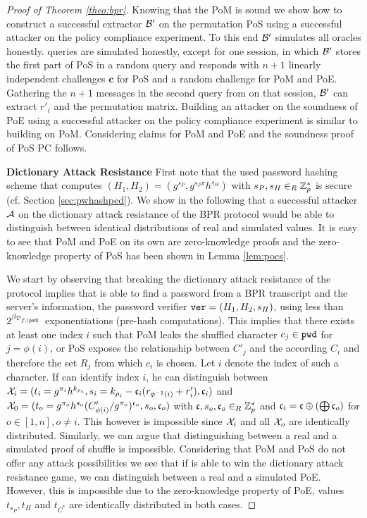 \begin{proof}[Proof of Theorem \ref{theo:bpr}]
Knowing that the \acl{PoM} is sound we show how to construct a successful extractor $\mathcal{B}'$ on the permutation \ac{PoS} using a successful attacker \cA on the policy compliance experiment.
To this end $\mathcal{B}'$ simulates all \Execute oracles honestly.
\Send queries are simulated honestly, except for one session, in which $\mathcal{B}'$ stores the first part of \ac{PoS} in a random \Send query and responds with $n+1$ linearly independent challenges $\bm c$ for \ac{PoS} and a random challenge \Ch for \ac{PoM} and \ac{PoE}.
Gathering the $n+1$ messages in the second \Send query from \cA on that session, $\mathcal{B}'$ can extract $r'_i$ and the permutation matrix.
Building an attacker on the soundness of \ac{PoE} using a successful attacker \cA on the policy compliance experiment is similar to building \cB on \ac{PoM}.
Considering claims for \ac{PoM} and \ac{PoE} and the soundness proof of \ac{PoS} \acl{PC} follows.

\smallskip\noindent
\textbf{Dictionary Attack Resistance}
First note that the used password hashing scheme that computes $(H_1,H_2)=(g^{s_P},\allowbreak g^{s_P \pi}h^{s_H})$ with $s_P,s_H\in_R\mathbb{Z}^\ast_p$ is secure (cf. Section \ref{sec:pwhashped}).
We show in the following that a successful attacker $\mathcal{A}$ on the dictionary attack resistance of the \ac{BPR} protocol would be able to distinguish between identical distributions of real and simulated values.
It is easy to see that \ac{PoM} and \ac{PoE} on its own are zero-knowledge proofs and the zero-knowledge property of \ac{PoS} has been shown in Lemma \ref{lem:pocs}.

We start by observing that breaking the dictionary attack resistance of the protocol implies that \cA is able to find a password \pwd from a \ac{BPR} transcript and the server's information, \ie the password verifier $\mathtt{ver}=(H_1,H_2,s_H)$, using less than $2^{\beta_{\mathcal{D}_{f,|\mathtt{pwd}|}}}$ exponentiations (pre-hash computations).
This implies that there exists at least one index $i$ such that \ac{PoM} leaks the shuffled character $c_j\in\mathtt{pwd}$ for $j=\phi(i)$, or \ac{PoS} exposes the relationship between $C'_j$ and the according $C_i$ and therefore the set $R_j$ from which $c_i$ is chosen.
Let $i$ denote the index of such a character.
If \cA can identify index $i$, he can distinguish between $\mathcal{X}_i=(t_i=g^{\pi_i}h^{k_{\rho_i}}, s_i=k_{\rho_i}-\mathfrak{c}_i(r_{\phi^{-1}(i)}+r'_i), \mathfrak{c}_i)$ and $\mathcal{X}_0=(t_o=g^{\pi_o}h^{s_o}(C'_{\phi(i)}/g^{\pi_o})^{\mathfrak{c}_o}, s_o, \mathfrak{c}_o)$ with $\mathfrak{c}, s_o, \mathfrak{c}_o\in_R\mathbb{Z}^\ast_p$ and $\mathfrak{c}_i=\mathfrak{c}\oplus \left(\bigoplus \mathfrak{c}_o\right)$ for $o\in[1,n], o\not=i$.
This however is impossible since $\mathcal{X}_i$ and all $\mathcal{X}_o$ are identically distributed.
Similarly, we can argue that distinguishing between a real and a simulated proof of shuffle is impossible.
Considering that \ac{PoM} and \ac{PoS} do not offer any attack possibilities we see that if \cA is able to win the dictionary attack resistance game, we can distinguish between a real and a simulated \ac{PoE}.
However, this is impossible due to the zero-knowledge property of \ac{PoE}, \ie values $t_{s_P}, t_H$ and $t_{C^\ast}$ are identically distributed in both cases.
\end{proof}

